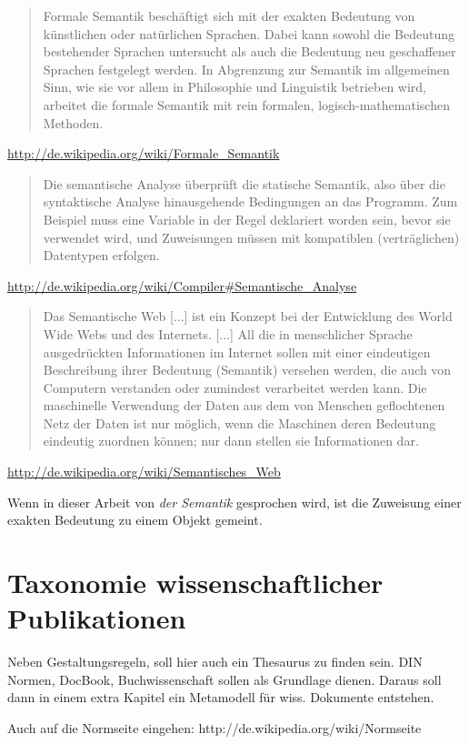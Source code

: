 \begin{quote}Formale Semantik beschäftigt sich mit der exakten Bedeutung von künstlichen
oder natürlichen Sprachen. Dabei kann sowohl die Bedeutung bestehender Sprachen untersucht
als auch die Bedeutung neu geschaffener Sprachen festgelegt werden.
In Abgrenzung zur Semantik im allgemeinen Sinn, wie sie vor allem in Philosophie und Linguistik
betrieben wird, arbeitet die formale Semantik mit rein formalen, logisch-mathematischen Methoden.
\end{quote}
\url{http://de.wikipedia.org/wiki/Formale_Semantik}

\begin{quote}Die semantische Analyse überprüft die statische Semantik,
also über die syntaktische Analyse hinausgehende Bedingungen an das Programm.
Zum Beispiel muss eine Variable in der Regel deklariert worden sein, bevor sie verwendet wird,
und Zuweisungen müssen mit kompatiblen (verträglichen) Datentypen erfolgen.
\end{quote}
\url{http://de.wikipedia.org/wiki/Compiler#Semantische_Analyse}

\begin{quote}Das Semantische Web [...] ist ein Konzept bei der Entwicklung des World Wide Webs und des 
Internets. [...] All die in menschlicher Sprache ausgedrückten Informationen im Internet sollen mit
einer eindeutigen Beschreibung ihrer Bedeutung (Semantik) versehen werden, die auch von Computern 
verstanden oder zumindest verarbeitet werden kann. Die maschinelle Verwendung der Daten aus dem von 
Menschen geflochtenen Netz der Daten ist nur möglich, wenn die Maschinen deren Bedeutung eindeutig 
zuordnen können; nur dann stellen sie Informationen dar.
\end{quote}
\url{http://de.wikipedia.org/wiki/Semantisches_Web}

Wenn in dieser Arbeit von \emph{der Semantik} gesprochen wird, ist die Zuweisung einer
exakten Bedeutung zu einem Objekt gemeint.

\section{Taxonomie wissenschaftlicher Publikationen}

Neben Gestaltungsregeln, soll hier auch ein Thesaurus zu finden sein.
DIN Normen, DocBook, Buchwissenschaft sollen als Grundlage dienen.
Daraus soll dann in einem extra Kapitel ein Metamodell für wiss. Dokumente
entstehen.

Auch auf die Normseite eingehen: http://de.wikipedia.org/wiki/Normseite

